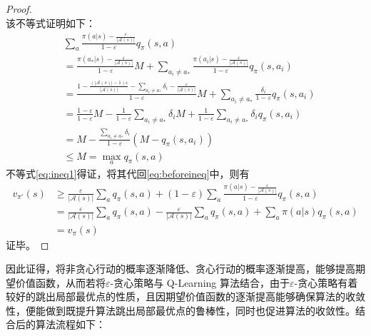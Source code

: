 \begin{proof}
\begin{equation}
    \end{equation}
    该不等式证明如下：
    \[
        \begin{aligned}
            &\sum_a\frac{\pi(a|s)-\frac{\varepsilon}{|\mathcal A(s)|}}{1-\varepsilon}q_\pi(s,a)\\
            &=\frac{\pi(a_*|s)-\frac{\varepsilon}{|\mathcal A(s)|}}{1-\varepsilon}M+\sum_{a_i\neq a_*}\frac{\pi(a_i|s)-\frac{\varepsilon}{|\mathcal A(s)|}}{1-\varepsilon}q_\pi(s,a_i)\\
            &= \frac{1-\frac{(|\mathcal A(s)|-1)\varepsilon}{|\mathcal A(s)|}-\sum_{a_i\neq a_*}\delta_i-\frac{\varepsilon}{|\mathcal A(s)|}}{1-\varepsilon}M+\sum_{a_i\neq a_*}\frac{\delta_i}{1-\varepsilon}q_\pi(s,a_i)\\
            &=\frac{1-\varepsilon}{1-\varepsilon}M-\frac{1}{1-\varepsilon}\sum_{a_i\neq a_*}\delta_iM+\frac{1}{1-\varepsilon}\sum_{a_i\neq a_*}\delta_iq_\pi(s,a_i)\\
            &=M-\frac{\sum_{a_i\neq a_*}\delta_i}{1-\varepsilon}(M-q_\pi(s,a_i))\\
            &\leq M=\max\limits_aq_\pi(s,a)
            \end{aligned}
    \]
    不等式\ref{eq:ineq1}得证，将其代回\ref{eq:beforeineq}中，则有
    \[
        \begin{aligned}
            v_{\pi'}(s)&\geq\frac{\varepsilon}{|\mathcal A(s)|}\sum_aq_\pi(s,a)+(1-\varepsilon)\sum_a\frac{\pi(a|s)-\frac{\varepsilon}{|\mathcal A(s)|}}{1-\varepsilon}q_\pi(s,a)\\
            &=\frac{\varepsilon}{|\mathcal A(s)|}\sum_aq_\pi(s,a)-\frac{\varepsilon}{|\mathcal A(s)|}\sum_aq_\pi(s,a)+\sum_a\pi(a|s)q_\pi(s,a)\\
            &=v_\pi(s)
            \end{aligned}
    \]
    证毕。
\end{proof}

因此证得，将非贪心行动的概率逐渐降低、贪心行动的概率逐渐提高，能够提高期望价值函数，从而若将$\varepsilon$-贪心策略与 Q-Learning 算法结合，由于$\varepsilon$-贪心策略有着较好的跳出局部最优点的性质，且因期望价值函数的逐渐提高能够确保算法的收敛性，便能做到既提升算法跳出局部最优点的鲁棒性，同时也促进算法的收敛性。结合后的算法流程如下：

